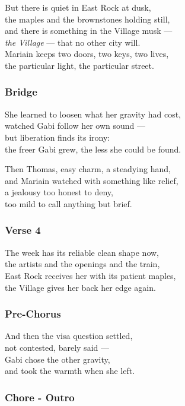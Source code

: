 But there is quiet in East Rock at dusk,\\
the maples and the brownstones holding still,\\
and there is something in the Village musk ---\\
\emph{the Village} --- that no other city will.\\
Mariain keeps two doors, two keys, two lives,\\
the particular light, the particular street.

\subsubsection{Bridge}\label{bridge-22}

She learned to loosen what her gravity had cost,\\
watched Gabi follow her own sound ---\\
but liberation finds its irony:\\
the freer Gabi grew, the less she could be found.

Then Thomas, easy charm, a steadying hand,\\
and Mariain watched with something like relief,\\
a jealousy too honest to deny,\\
too mild to call anything but brief.

\subsubsection{Verse 4}\label{verse-4-13}

The week has its reliable clean shape now,\\
the artists and the openings and the train,\\
East Rock receives her with its patient maples,\\
the Village gives her back her edge again.

\subsubsection{Pre-Chorus}\label{pre-chorus-53}

And then the visa question settled,\\
not contested, barely said ---\\
Gabi chose the other gravity,\\
and took the warmth when she left.

\subsubsection{Chore - Outro}\label{chore---outro}

